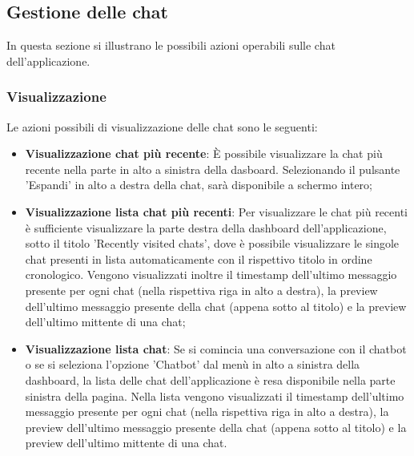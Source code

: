 \documentclass[10pt, a4paper]{article}
\begin{document}
\subsection{Gestione delle chat}
In questa sezione si illustrano le possibili azioni operabili sulle chat dell'applicazione. 
\subsubsection{Visualizzazione}
Le azioni possibili di visualizzazione delle chat sono le seguenti:
\begin{itemize}
    \item \textbf{Visualizzazione chat più recente}: È possibile visualizzare la chat più recente nella parte in alto a sinistra della dasboard. Selezionando il pulsante 'Espandi' in alto a destra della chat, sarà disponibile a schermo intero;
    \item \textbf{Visualizzazione lista chat più recenti}: Per visualizzare le chat più recenti è sufficiente visualizzare la parte destra della dashboard dell'applicazione, sotto il titolo 'Recently visited chats', dove è possibile visualizzare le singole chat presenti in lista automaticamente con il rispettivo titolo in ordine cronologico. Vengono visualizzati inoltre il timestamp dell'ultimo messaggio presente per ogni chat (nella rispettiva riga in alto a destra), la preview dell'ultimo messaggio presente della chat (appena sotto al titolo) e la preview dell'ultimo mittente di una chat;
    \item \textbf{Visualizzazione lista chat}: Se si comincia una conversazione con il chatbot o se si seleziona l'opzione 'Chatbot' dal menù in alto a sinistra della dashboard, la lista delle chat dell'applicazione è resa disponibile nella parte sinistra della pagina. Nella lista vengono visualizzati il timestamp dell'ultimo messaggio presente per ogni chat (nella rispettiva riga in alto a destra), la preview dell'ultimo messaggio presente della chat (appena sotto al titolo) e la preview dell'ultimo mittente di una chat.
\end{itemize}
\end{document}
